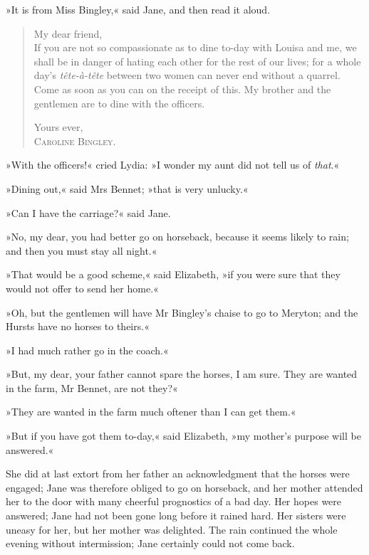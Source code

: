 »It is from Miss Bingley,« said Jane, and then read it aloud.


\begin{samepage}
\begin{quotation}
\noindent My dear friend,\\

\indent If you are not so compassionate as to dine to-day with Louisa and me, we shall be in danger of hating each other for the rest of our lives; for a whole day's \textit{tête-à-tête} between two women can never end without a quarrel. Come as soon as you can on the receipt of this. My brother and the gentlemen are to dine with the officers. \\

\begin{flushright}
Yours ever,\\
\textsc{Caroline Bingley.}
\end{flushright}
\end{quotation}
\end{samepage}

»With the officers!« cried Lydia: »I wonder my aunt did not tell us of \textit{that}.«

»Dining out,« said Mrs Bennet; »that is very unlucky.«

»Can I have the carriage?« said Jane.

»No, my dear, you had better go on horseback, because it seems likely to rain; and then you must stay all night.«

»That would be a good scheme,« said Elizabeth, »if you were sure that they would not offer to send her home.«

»Oh, but the gentlemen will have Mr Bingley's chaise to go to Meryton; and the Hursts have no horses to theirs.«

»I had much rather go in the coach.«

»But, my dear, your father cannot spare the horses, I am sure. They are wanted in the farm, Mr Bennet, are not they?«


»They are wanted in the farm much oftener than I can get them.«

»But if you have got them to-day,« said Elizabeth, »my mother's purpose will be answered.«



She did at last extort from her father an acknowledgment that the horses were engaged; Jane was therefore obliged to go on horseback, and her mother attended her to the door with many cheerful prognostics of a bad day. Her hopes were answered; Jane had not been gone long before it rained hard. Her sisters were uneasy for her, but her mother was delighted. The rain continued the whole evening without intermission; Jane certainly could not come back.

